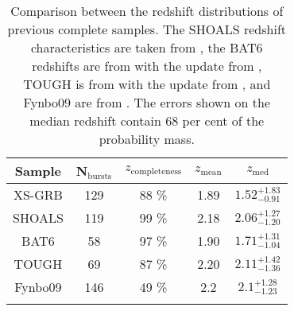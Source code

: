 \begin{table}[H]
	\centering
	\begin{tabular}{ccccc}
		\hline
		\hline\noalign{\smallskip}
		{Sample} & {N$_{\mathrm{bursts}}$} & {$z_{\mathrm{completeness}}$} &  {$z_{\mathrm{mean}}$} &  {$z_{\mathrm{med}}$} \\
		\hline\noalign{\smallskip}
		{\smallskip}
		XS-GRB & 129 & 88 \% & 1.89 & $1.52_{-0.91}^{+1.83}$ \\
		{\smallskip}
		SHOALS  & 119 &  99 \% &  2.18  & $2.06_{-1.20}^{+1.27}$ \\
		{\smallskip}
		BAT6 & 58 & 97 \% &  1.90 &  $1.71_{-1.04}^{+1.31}$ \\
		{\smallskip}
		TOUGH & 69 &  87 \% & 2.20 & $2.11_{-1.36}^{+1.42}$ \\
		{\smallskip}
		Fynbo09 & 146 &  49 \% &  2.2 & $2.1_{-1.23}^{+1.28}$ \\
		\hline\noalign{\smallskip}

\end{tabular} 

\caption{Comparison between the redshift distributions of previous complete
	samples. The SHOALS redshift characteristics are taken from \citet{Perley2016a},
	the BAT6 redshifts are from \citet{Salvaterra2012} with the update from
	\citet{Pescalli2016}, TOUGH is from \cite{Hjorth2012} with the update from
	\citet{Schulze2015}, and Fynbo09 are from \citet{Fynbo2009}. The errors shown on
	the median redshift contain 68 per cent of the probability mass.
	\label{tab:redshift_comparison}}



\end{table}